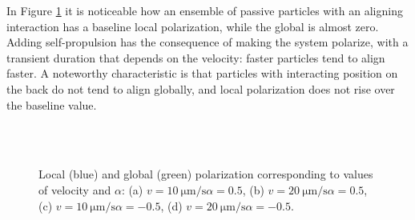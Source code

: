 \documentclass[../../master_thesis_np.tex]{subfiles}
\begin{document}
		In Figure \ref{fig:lj_velocity_pol} it is noticeable how an ensemble of passive particles with an aligning interaction has a baseline local polarization, while the global is almost zero. 
		Adding self-propulsion has the consequence of making the system polarize, with a transient duration that depends on the velocity: faster particles tend to align faster. 
		A noteworthy characteristic is that particles with interacting position on the back do not tend to align globally, and local polarization does not rise over the baseline value.
		
		\begin{figure}[hbtp]
			\centering\
			\\
			\\
			
			\caption{Local (blue) and global (green) polarization corresponding to values of velocity and $\alpha$: (a) $v = \SI{10}{\um \per \second} \alpha = 0.5$, (b) $v = \SI{20}{\um \per \second} \alpha = 0.5$, (c) $v = \SI{10}{\um \per \second} \alpha = -0.5$, (d) $v = \SI{20}{\um \per \second} \alpha = -0.5$.}
			\label{fig:lj_velocity_pol}
		\end{figure}
\end{document}

